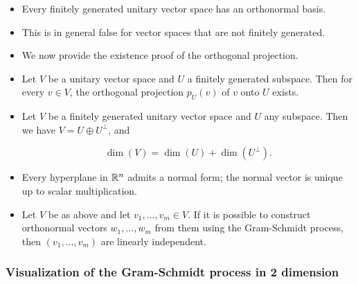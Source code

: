 \begin{itemize}

    \item Every finitely generated unitary vector space has an orthonormal basis.
    
    \item This is in general false for vector spaces that are not finitely generated.
    
    \item We now provide the existence proof of the orthogonal projection.
    
    \item Let \( V \) be a unitary vector space and \( U \) a finitely generated subspace. 
          Then for every \( v \in V \), the orthogonal projection \( p_U(v) \) of \( v \) onto \( U \) 
          exists.

    \item Let \( V \) be a finitely generated unitary vector space and \( U \) any subspace. Then we have \( V = U \oplus U^\perp \), and
      
          \[
                \dim(V) = \dim(U) + \dim(U^\perp).
          \]
    
    \item Every hyperplane in \( \mathbb{R}^n \) admits a normal form; the normal vector is 
          unique up to scalar multiplication.
    
    \item Let \( V \) be as above and let \( v_1, \ldots, v_m \in V \). If it is possible to 
          construct orthonormal vectors \( w_1, \ldots, w_m \) from them using the Gram-Schmidt process, 
          then \( (v_1, \ldots, v_m) \) are linearly independent.

\end{itemize}

\subsubsection{Visualization of the Gram-Schmidt process in 2 dimension}

\begin{center}
\end{center}

